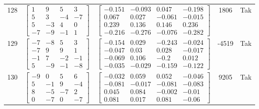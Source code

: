 \documentclass[a4paper,12pt]{article}
\begin{document}
\begin{tabular}{c c c c c}
128
&
$\begin{bmatrix} 1 & 9 & 5 & 3 \\ 5 & 3 & -4 & -7 \\ 5 & -3 & 4 & 0 \\ -7 & -9 & -1 & 1 \end{bmatrix}$
&
$\begin{bmatrix} -0.151 & -0.093 & 0.047 & -0.198 \\ 0.067 & 0.027 & -0.061 & -0.015 \\ 0.239 & 0.136 & 0.146 & 0.236 \\ -0.216 & -0.276 & -0.076 & -0.282 \end{bmatrix}$
&
1806
&
Tak
\\
129
&
$\begin{bmatrix} -7 & -8 & 5 & 3 \\ -7 & 9 & 9 & 1 \\ -1 & 7 & -2 & -1 \\ 5 & -9 & -1 & -8 \end{bmatrix}$
&
$\begin{bmatrix} -0.154 & 0.029 & -0.243 & -0.024 \\ -0.047 & 0.03 & 0.028 & -0.017 \\ -0.069 & 0.106 & -0.2 & 0.012 \\ -0.035 & -0.029 & -0.159 & -0.122 \end{bmatrix}$
&
-4519
&
Tak
\\
130
&
$\begin{bmatrix} -9 & 0 & 5 & 6 \\ 5 & -1 & 9 & -4 \\ 8 & -5 & -7 & 2 \\ 0 & -7 & 0 & -7 \end{bmatrix}$
&
$\begin{bmatrix} -0.032 & 0.059 & 0.052 & -0.046 \\ -0.081 & -0.017 & -0.081 & -0.083 \\ 0.045 & 0.084 & -0.002 & -0.01 \\ 0.081 & 0.017 & 0.081 & -0.06 \end{bmatrix}$
&
9205
&
Tak
\\
\end{tabular} \egroup \newpage
\end{document}
